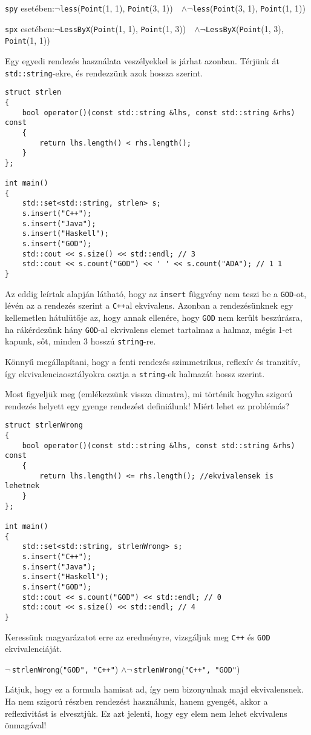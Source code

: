 \documentclass[../cpp_book/cpp_book.tex]{subfiles}
\begin{document}
	\begin{center}	
		\texttt{spy} esetében:\quad  $\neg$\texttt{less}\big(\texttt{Point}(1, 1), \texttt{Point}(3, 1)\big) \,\, $\wedge$\quad $\neg$\texttt{less}\big(\texttt{Point}(3, 1), \texttt{Point}(1, 1)\big)
		
		\texttt{spx} esetében:\quad  $\neg$\texttt{LessByX}\big(\texttt{Point}(1, 1), \texttt{Point}(1, 3)\big) \,\, $\wedge$\quad $\neg$\texttt{LessByX}\big(\texttt{Point}(1, 3), \texttt{Point}(1, 1)\big)
	\end{center}
	Egy egyedi rendezés használata veszélyekkel is járhat azonban. Térjünk át \texttt{std::string}-ekre, és rendezzünk azok hossza szerint.
	\begin{lstlisting}
struct strlen
{
	bool operator()(const std::string &lhs, const std::string &rhs) const
	{
		return lhs.length() < rhs.length();
	}
};

int main()
{
	std::set<std::string, strlen> s;
	s.insert("C++");
	s.insert("Java");
	s.insert("Haskell");
	s.insert("GOD");
	std::cout << s.size() << std::endl; // 3
	std::cout << s.count("GOD") << ' ' << s.count("ADA"); // 1 1
}
\end{lstlisting}
	Az eddig leírtak alapján látható, hogy az \texttt{insert} függvény nem teszi be a \texttt{GOD}-ot, lévén az a rendezés szerint a \texttt{C++}al ekvivalens. Azonban a rendezésünknek egy kellemetlen hátulütője az, hogy annak ellenére, hogy \texttt{GOD} nem került beszúrásra, ha rákérdezünk hány \texttt{GOD}-al ekvivalens elemet tartalmaz a halmaz, mégis 1-et kapunk, sőt, minden 3 hosszú \texttt{string}-re.
	\begin{note}
		Könnyű megállapítani, hogy a fenti rendezés szimmetrikus, reflexív és tranzitív, így ekvivalenciaosztályokra osztja a \texttt{string}-ek halmazát hossz szerint.
	\end{note}
	Most figyeljük meg (emlékezzünk vissza dimatra), mi történik hogyha szigorú rendezés helyett egy gyenge rendezést definiálunk! Miért lehet ez problémás?
\begin{lstlisting}
struct strlenWrong
{
	bool operator()(const std::string &lhs, const std::string &rhs) const
	{
		return lhs.length() <= rhs.length(); //ekvivalensek is lehetnek
	}
};

int main()
{
	std::set<std::string, strlenWrong> s;
	s.insert("C++");
	s.insert("Java");
	s.insert("Haskell");
	s.insert("GOD");
	std::cout << s.count("GOD") << std::endl; // 0
	std::cout << s.size() << std::endl; // 4
}
\end{lstlisting}
	Keressünk magyarázatot erre az eredményre, vizsgáljuk meg \texttt{C++} és \texttt{GOD} ekvivalenciáját.
	\begin{center}
		$\neg$\,\texttt{strlenWrong}\big(\texttt{"GOD", "C++"}\big)\quad 
		$\wedge$\quad $\neg$\,\texttt{strlenWrong}\big(\texttt{"C++", "GOD"}\big)
	\end{center}
	Látjuk, hogy ez a formula hamisat ad, így nem bizonyulnak majd ekvivalensnek. Ha nem szigorú részben rendezést használunk, hanem gyengét, akkor a reflexivitást is elvesztjük. Ez azt jelenti, hogy egy elem nem lehet ekvivalens önmagával!
	
\end{document}
